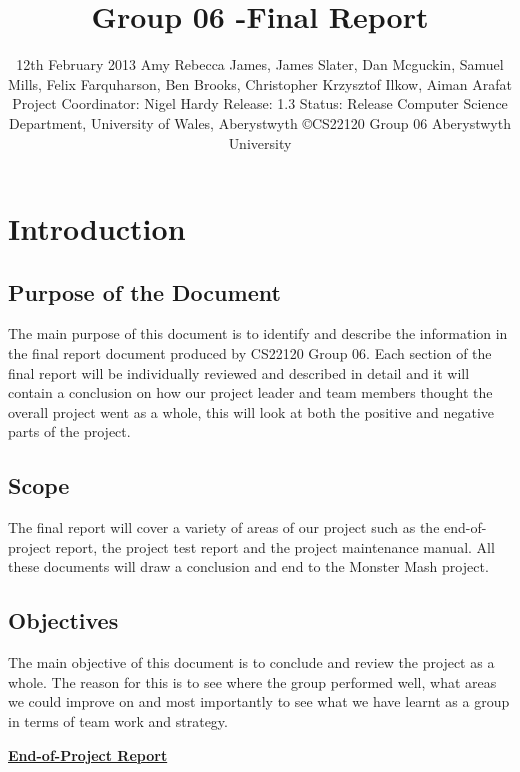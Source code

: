 \documentclass[titlepage]{article}
\title{Group 06 -Final Report}
\date{12th February 2013 \linebreak Amy Rebecca James, James Slater, Dan Mcguckin, Samuel Mills, Felix Farquharson, \linebreak Ben Brooks, Christopher Krzysztof Ilkow, Aiman Arafat \linebreak Project Coordinator: Nigel Hardy \linebreak Release: 1.3 \linebreak Status: Release \linebreak Computer Science Department, University of Wales, Aberystwyth \linebreak \copyright CS22120 Group 06 Aberystwyth University}
\begin{document}
\maketitle
\tableofcontents
\newpage
\section{Introduction}
\subsection{Purpose of the Document}
The main purpose of this document is to identify and describe the information in the final report document produced by CS22120 Group 06. Each section of the final report will be individually reviewed and described in detail and it will contain a conclusion on how our project leader and team members thought the overall project went as a whole, this will look at both the positive and negative parts of the project.
\subsection{Scope}
The final report will cover a variety of areas of our project such as the end-of-project report, the project test report and the project maintenance manual. All these documents will draw a conclusion and end to the Monster Mash project.
\subsection{Objectives}
The main objective of this document is to conclude and review the project as a whole. The reason for this is to see where the group performed well, what areas we could improve on and most importantly to see what we have learnt as a group in terms of team work and strategy.
\newpage

\large \underline {\bf {End-of-Project Report}}
\end{document}
